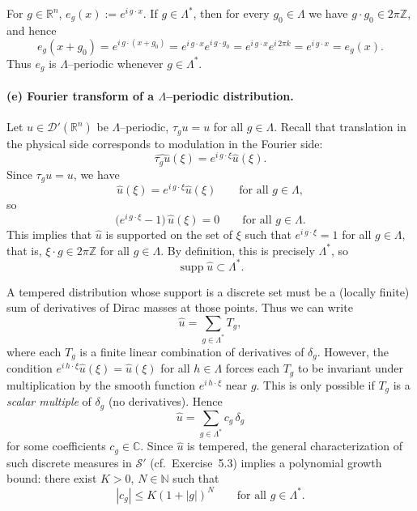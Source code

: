 \documentclass[12pt,a4paper]{article}
\theoremstyle{plain}
\theoremstyle{definition}
\theoremstyle{remark}
\theoremstyle{remark}
\begin{document}
	For $g\in\mathbb{R}^n$, $e_g(x):=e^{i\,g\cdot x}$.  If $g\in\Lambda^*$,
	then for every $g_0\in\Lambda$ we have $g\cdot g_0 \in 2\pi\mathbb{Z}$,
	and hence
	\[
	e_g(x+g_0)
	= e^{i\,g\cdot(x+g_0)}
	= e^{i\,g\cdot x} e^{i\,g\cdot g_0}
	= e^{i\,g\cdot x} e^{i\,2\pi k}
	= e^{i\,g\cdot x} = e_g(x).
	\]
	Thus $e_g$ is $\Lambda$–periodic whenever $g\in\Lambda^*$.
	
	\bigskip
	
	
	\paragraph{(e) Fourier transform of a $\Lambda$–periodic distribution.}
	
	Let $u\in\mathcal{D}'(\mathbb{R}^n)$ be $\Lambda$–periodic,
	$\tau_g u = u$ for all $g\in\Lambda$.  Recall that translation in the
	physical side corresponds to modulation in the Fourier side:
	\[
	\widehat{\tau_g u}(\xi)
	= e^{i\,g\cdot\xi}\widehat u(\xi).
	\]
	Since $\tau_g u = u$, we have
	\[
	\widehat u(\xi)
	= e^{i\,g\cdot\xi}\widehat u(\xi)
	\qquad \text{for all } g\in\Lambda,
	\]
	so
	\[
	\bigl(e^{i\,g\cdot\xi}-1\bigr)\,\widehat u(\xi) = 0
	\qquad\text{for all } g\in\Lambda.
	\]
	This implies that $\widehat u$ is supported on the set of $\xi$ such
	that $e^{i\,g\cdot\xi}=1$ for all $g\in\Lambda$, that is,
	$\xi\cdot g\in 2\pi\mathbb{Z}$ for all $g\in\Lambda$.  By definition,
	this is precisely $\Lambda^*$, so
	\[
	\operatorname{supp}\widehat u \subset \Lambda^*.
	\]
	
	A tempered distribution whose support is a discrete set must be a
	(locally finite) sum of derivatives of Dirac masses at those points.
	Thus we can write
	\[
	\widehat u
	= \sum_{g\in\Lambda^*} T_g,
	\]
	where each $T_g$ is a finite linear combination of derivatives of
	$\delta_g$.  However, the condition
	$e^{i\,h\cdot\xi}\widehat u(\xi)=\widehat u(\xi)$ for all $h\in\Lambda$
	forces each $T_g$ to be invariant under multiplication by the smooth
	function $e^{i\,h\cdot\xi}$ near $g$.  This is only possible if $T_g$ is
	a \emph{scalar multiple} of $\delta_g$ (no derivatives).  Hence
	\[
	\widehat u
	= \sum_{g\in\Lambda^*} c_g\,\delta_g
	\]
	for some coefficients $c_g\in\mathbb{C}$.  Since $\widehat u$ is
	tempered, the general characterization of such discrete measures in
	$\mathcal{S}'$ (cf.\ Exercise~5.3) implies a polynomial growth bound:
	there exist $K>0$, $N\in\mathbb{N}$ such that
	\[
	|c_g| \le K(1+|g|)^N
	\qquad \text{for all } g\in\Lambda^*.
	\]
	
\end{document}
